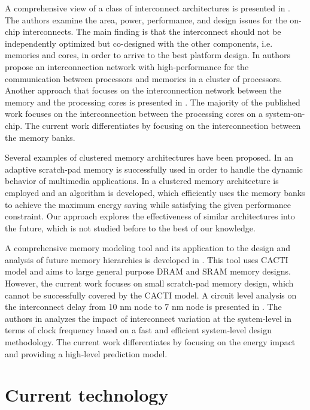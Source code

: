 A comprehensive view of a class of interconnect architectures is presented in \cite{kumar2005interconnections}. 
The authors examine the area, power, performance, and design issues for the on-chip interconnects.
The main finding is that the interconnect should not be independently optimized but co-designed with the other components, i.e. memories and cores, in order to arrive to the best platform design.
In \cite{rahimi2011fully} authors propose an interconnection network with high-performance for the communication between processors and memories in a cluster of processors.
Another approach that focuses on the interconnection network between the memory and the processing cores is presented in \cite{kang2012high}. 
The majority of the published work focuses on the interconnection between the processing cores on a system-on-chip.
The current work differentiates by focusing on the interconnection between the memory banks.

Several examples of clustered memory architectures have been proposed.
In \cite{cho2009adaptive} an adaptive scratch-pad memory is successfully used in order to handle the dynamic behavior of multimedia applications.
In \cite{wang2005energy} a clustered memory architecture is employed and an algorithm is developed, which efficiently uses the memory banks to achieve the maximum energy saving while satisfying the given performance constraint.
Our approach explores the effectiveness of similar architectures into the future, which is not studied before to the best of our knowledge.

A comprehensive memory modeling tool and its application to the design and analysis of future memory hierarchies is developed in \cite{thoziyoor2008comprehensive}. 
This tool uses CACTI model and aims to large general purpose DRAM and SRAM memory designs.
However, the current work focuses on small scratch-pad memory design, which cannot be successfully covered by the CACTI model.
A circuit level analysis on the interconnect delay from 10 nm node to 7 nm node is presented in \cite{pan2014system}.
The authors in \cite{chen2014interconnect} analyzes the impact of interconnect variation at the system-level in terms of clock frequency based on a fast and efficient system-level design methodology. 
The current work differentiates by focusing on the energy impact and providing a high-level prediction model.

\section{Current technology}
\label{Current}

